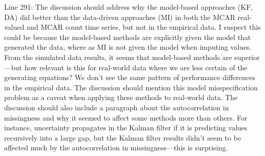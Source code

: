 \documentclass{article}
\begin{document}
\begin{linenumbers}
Line 291: The discussion should address why the model-based approaches (KF, DA) did better than the data-driven approaches (MI) in both the MCAR real-valued and MCAR count time series, but not in the empirical data. I suspect this could be because the model-based methods are explicitly given the model that generated the data, where as MI is not given the model when imputing values. From the simulated data results, it seems that model-based methods are superior—but how relevant is this for real-world data where we are less certain of the generating equations? We don’t see the same pattern of performance differences in the empirical data. The discussion should mention this model misspecification problem as a caveat when applying these methods to real-world data. The discussion should also include a paragraph about the autocorrelation in missingness and why it seemed to affect some methods more than others. For instance, uncertainty propagates in the Kalman filter if it is predicting values recursively into a large gap, but the Kalman filter results didn’t seem to be affected much by the autocorrelation in missingness—this is surprising.



\end{linenumbers}
\end{document}
